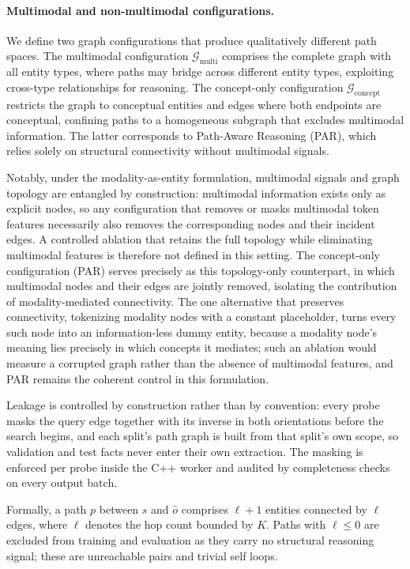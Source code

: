 \documentclass[runningheads]{llncs}
\begin{document}
\paragraph{Multimodal and non-multimodal configurations.}
We define two graph configurations that produce qualitatively different path spaces.
The multimodal configuration $\mathcal{G}_{\text{multi}}$ comprises the complete
graph with all entity types, where paths may bridge across different entity types,
exploiting cross-type relationships for reasoning.  The concept-only configuration
$\mathcal{G}_{\text{concept}}$ restricts the graph to conceptual entities and
edges where both endpoints are conceptual, confining paths to a homogeneous
subgraph that excludes multimodal information.  The latter corresponds to
Path-Aware Reasoning (PAR), which relies solely on structural connectivity
without multimodal signals.

Notably, under the modality-as-entity formulation, multimodal signals and
graph topology are entangled by construction: multimodal information exists
only as explicit nodes, so any configuration that removes or masks multimodal
token features necessarily also removes the corresponding nodes and their
incident edges. A controlled ablation that retains the full topology while
eliminating multimodal features is therefore not defined in this setting.
The concept-only configuration (PAR) serves precisely as this topology-only
counterpart, in which multimodal nodes and their edges are jointly removed,
isolating the contribution of modality-mediated connectivity. The one
alternative that preserves connectivity, tokenizing modality nodes with a
constant placeholder, turns every such node into an information-less dummy
entity, because a modality node's meaning lies precisely in which concepts
it mediates; such an ablation would measure a corrupted graph rather than
the absence of multimodal features, and PAR remains the coherent control
in this formulation.

Leakage is controlled by construction rather than by convention:
every probe masks the query edge together with its inverse in both
orientations before the search begins, and each split's path graph is
built from that split's own scope, so validation and test facts never
enter their own extraction. The masking is enforced per probe inside
the C++ worker and audited by completeness checks on every output
batch.

Formally, a path $p$ between $s$ and $\hat{o}$ comprises $\ell + 1$
entities connected by $\ell$ edges, where
$\ell$ denotes the hop count bounded by $K$.
Paths with $\ell \leq 0$ are excluded from training and evaluation as they
carry no structural reasoning signal; these are unreachable pairs and
trivial self loops.
\end{document}
